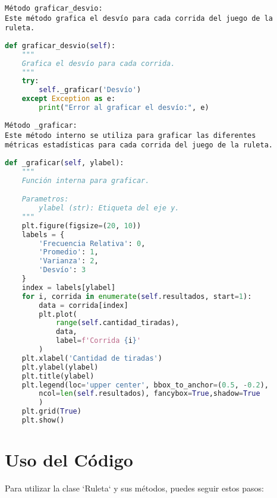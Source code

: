 \documentclass{article}
\begin{document}
\begin{itemize}
\begin{verbatim}
Método graficar_desvio:
Este método grafica el desvío para cada corrida del juego de la ruleta.
\end{verbatim}

\begin{lstlisting}[language=Python]
def graficar_desvio(self):
    """
    Grafica el desvío para cada corrida.
    """
    try:
        self._graficar('Desvío')
    except Exception as e:
        print("Error al graficar el desvío:", e)
\end{lstlisting}

\begin{verbatim}
Método _graficar:
Este método interno se utiliza para graficar las diferentes
métricas estadísticas para cada corrida del juego de la ruleta.
\end{verbatim}

\begin{lstlisting}[language=Python]
def _graficar(self, ylabel):
    """
    Función interna para graficar.

    Parametros:
        ylabel (str): Etiqueta del eje y.
    """
    plt.figure(figsize=(20, 10))
    labels = {
        'Frecuencia Relativa': 0,
        'Promedio': 1,
        'Varianza': 2,
        'Desvío': 3
    }
    index = labels[ylabel]
    for i, corrida in enumerate(self.resultados, start=1):
        data = corrida[index]
        plt.plot(
            range(self.cantidad_tiradas),
            data,
            label=f'Corrida {i}'
        )
    plt.xlabel('Cantidad de tiradas')
    plt.ylabel(ylabel)
    plt.title(ylabel)
    plt.legend(loc='upper center', bbox_to_anchor=(0.5, -0.2),
        ncol=len(self.resultados), fancybox=True,shadow=True
        )
    plt.grid(True)
    plt.show()
\end{lstlisting}
\end{itemize}
\clearpage





\section{Uso del Código}

Para utilizar la clase `Ruleta` y sus métodos, puedes seguir estos pasos:
\end{document}
